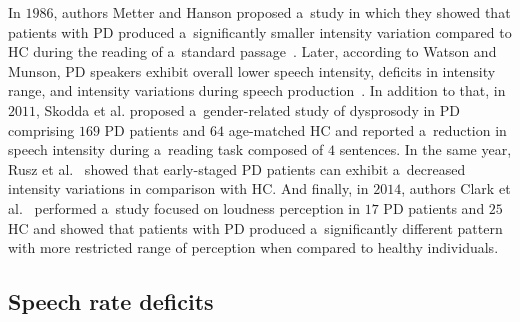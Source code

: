 In $1986$, authors Metter and Hanson proposed a~study in which they showed that patients with PD produced a~significantly smaller intensity variation compared to HC during the reading of a~standard passage~\cite{Metter1986}. Later, according to Watson and Munson, PD speakers exhibit overall lower speech intensity, deficits in intensity range, and intensity variations during speech production~\cite{Watson2008}. In addition to that, in $2011$, Skodda et al. proposed a~gender-related study of dysprosody in PD~\cite{Skodda2011c} comprising $169$ PD patients and $64$ age-matched HC and reported a~reduction in speech intensity during a~reading task composed of $4$ sentences. In the same year, Rusz et al.~\cite{Rusz2011} showed that early-staged PD patients can exhibit a~decreased intensity variations in comparison with HC. And finally, in $2014$, authors Clark et al.~\cite{Clark2014} performed a~study focused on loudness perception in $17$ PD patients and $25$ HC and showed that patients with PD produced a~significantly different pattern with more restricted range of perception when compared to healthy individuals.

\subsection{Speech rate deficits}
\label{ch4_1_3}

